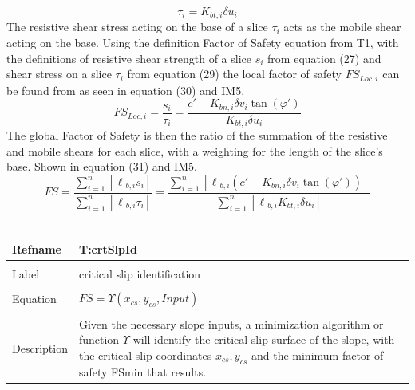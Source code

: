 \documentclass[12pt]{article}
\begin{document}
\begin{equation}
\tau{}_{i}=K_{bt,i}\delta{}u_{i}
\end{equation}
The resistive shear stress acting on the base of a slice $\tau{}_{i}$ acts as the mobile shear acting on the base. Using the definition Factor of Safety equation from T1, with the definitions of resistive shear strength of a slice $s_{i}$ from equation (27) and shear stress on a slice $\tau{}_{i}$ from equation (29) the local factor of safety $FS_{Loc,i}$ can be found from as seen in equation (30) and IM5.
\begin{equation}
FS_{Loc,i}=\frac{s_{i}}{\tau{}_{i}}=\frac{c'-K_{bn,i}\delta{}v_{i}\tan\left(\varphi{}'\right)}{K_{bt,i}\delta{}u_{i}}
\end{equation}
The global Factor of Safety is then the ratio of the summation of the resistive and mobile shears for each slice, with a weighting for the length of the slice's base. Shown in equation (31) and IM5.
\begin{equation}
FS=\frac{\displaystyle\sum_{i=1}^{n}{\left[\ell{}_{b,i}s_{i}\right]}}{\displaystyle\sum_{i=1}^{n}{\left[\ell{}_{b,i}\tau{}_{i}\right]}}=\frac{\displaystyle\sum_{i=1}^{n}{\left[\ell{}_{b,i}\left(c'-K_{bn,i}\delta{}v_{i}\tan\left(\varphi{}'\right)\right)\right]}}{\displaystyle\sum_{i=1}^{n}{\left[\ell{}_{b,i}K_{bt,i}\delta{}u_{i}\right]}}
\end{equation}
~\newline
\noindent \begin{minipage}{\textwidth}
\begin{tabular}{p{} p{}}
\toprule \textbf{Refname} & \textbf{T:crtSlpId}
\label{T:crtSlpId}
\\ \midrule \\
Label & critical slip identification
\\ \midrule \\
Equation & $FS=\Upsilon{}\left({x_{cs},y_{cs}},Input\right)$
\\ \midrule \\
Description & Given the necessary slope inputs, a minimization algorithm or function $\Upsilon{}$ will identify the critical slip surface of the slope, with the critical slip coordinates ${x_{cs},y_{cs}}$ and the minimum factor of safety FSmin that results.
\\ \bottomrule \end{tabular}
\end{minipage}\\
\end{document}
